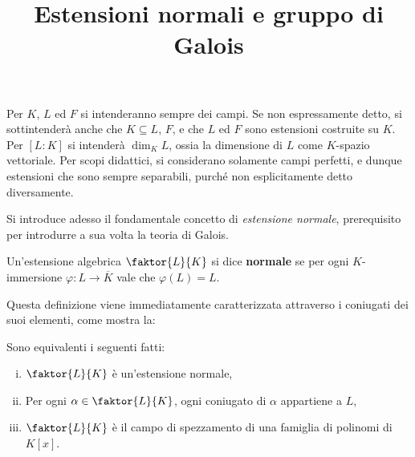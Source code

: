 \documentclass[12pt]{scrartcl}
\begin{document}
	\title{Estensioni normali e gruppo di Galois}
	\maketitle
	
	\begin{note}
		Per $K$, $L$ ed $F$ si intenderanno sempre dei campi.
		Se non espressamente detto, si sottintenderà anche
		che $K \subseteq L$, $F$, e che $L$ ed $F$ sono
		estensioni costruite su $K$. Per $[L : K]$ si
		intenderà $\dim_K L$, ossia la dimensione di $L$
		come $K$-spazio vettoriale. Per scopi didattici, si
		considerano solamente campi perfetti, e dunque estensioni che sono sempre separabili, purché
		non esplicitamente detto diversamente.
	\end{note} \bigskip

	Si introduce adesso il fondamentale concetto di
	\textit{estensione normale}, prerequisito per
	introdurre a sua volta la teoria di Galois.
	
	\begin{definition}
		Un'estensione algebrica
		$\faktor{L}{K}$ si dice \textbf{normale}
		se per ogni $K$-immersione $\varphi : L \to \overline{K}$
		vale che $\varphi(L) = L$.
	\end{definition}

	Questa definizione viene immediatamente caratterizzata
	attraverso i coniugati dei suoi elementi, come mostra
	la:
	
	\begin{proposition}
		Sono equivalenti i seguenti fatti:
		
		\begin{enumerate}[(i)]
			\item $\faktor{L}{K}$ è un'estensione normale,
			\item Per ogni $\alpha \in \faktor{L}{K}$, ogni coniugato
			di $\alpha$ appartiene a $L$,
			\item $\faktor{L}{K}$ è il campo di spezzamento
			di una famiglia di polinomi di $K[x]$.
		\end{enumerate}
	\end{proposition}
\end{document}
